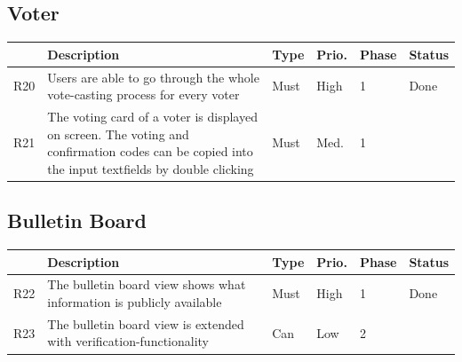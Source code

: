 \subsection{Voter}
\begin{longtable}{p{0.5cm}p{9cm}p{1cm}p{1cm}p{1cm}p{1cm}}
\hline
 & Description & Type & Prio. & Phase & Status\\
\hline
R20 & Users are able to go through the whole vote-casting process for every voter & Must & High & 1 & Done\\
R21 & The voting card of a voter is displayed on screen. The voting and confirmation codes can be copied into the input textfields by double clicking & Must & Med. & 1 & \\
\end{longtable}


\subsection{Bulletin Board}
\begin{longtable}{p{0.5cm}p{9cm}p{1cm}p{1cm}p{1cm}p{1cm}}
\hline
 & Description & Type & Prio. & Phase & Status\\
\hline
R22 & The bulletin board view shows what information is publicly available & Must & High & 1 & Done\\
R23 & The bulletin board view is extended with verification-functionality & Can & Low & 2 & \\
\end{longtable}

